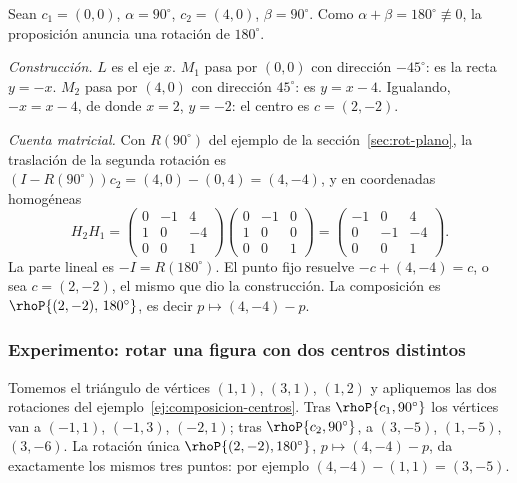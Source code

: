 \begin{ejemplo}\label{ej:composicion-centros}
Sean \(c_1=(0,0)\), \(\alpha=90^\circ\), \(c_2=(4,0)\), \(\beta=90^\circ\). Como
\(\alpha+\beta=180^\circ\not\equiv0\), la proposición anuncia una rotación de \(180^\circ\).

\emph{Construcción.} \(L\) es el eje \(x\). \(M_1\) pasa por \((0,0)\) con dirección
\(-45^\circ\): es la recta \(y=-x\). \(M_2\) pasa por \((4,0)\) con dirección \(45^\circ\):
es \(y=x-4\). Igualando, \(-x=x-4\), de donde \(x=2\), \(y=-2\): el centro es \(c=(2,-2)\).

\emph{Cuenta matricial.} Con \(R(90^\circ)\) del ejemplo de la sección~\ref{sec:rot-plano}, la
traslación de la segunda rotación es \((I-R(90^\circ))c_2=(4,0)-(0,4)=(4,-4)\), y en
coordenadas homogéneas
\[
H_2H_1=
\begin{pmatrix}0&-1&4\\1&0&-4\\0&0&1\end{pmatrix}
\begin{pmatrix}0&-1&0\\1&0&0\\0&0&1\end{pmatrix}
=\begin{pmatrix}-1&0&4\\0&-1&-4\\0&0&1\end{pmatrix}.
\]
La parte lineal es \(-I=R(180^\circ)\). El punto fijo resuelve \(-c+(4,-4)=c\), o sea
\(c=(2,-2)\), el mismo que dio la construcción. La composición es
\(\rhoP{(2,-2),\,180^\circ}\), es decir \(p\mapsto(4,-4)-p\).
\end{ejemplo}

\subsubsection{Experimento: rotar una figura con dos centros distintos}

Tomemos el triángulo de vértices \((1,1)\), \((3,1)\), \((1,2)\) y apliquemos las dos
rotaciones del ejemplo~\ref{ej:composicion-centros}. Tras \(\rhoP{c_1,90^\circ}\) los vértices
van a \((-1,1)\), \((-1,3)\), \((-2,1)\); tras \(\rhoP{c_2,90^\circ}\), a \((3,-5)\),
\((1,-5)\), \((3,-6)\). La rotación única \(\rhoP{(2,-2),180^\circ}\), \(p\mapsto(4,-4)-p\),
da exactamente los mismos tres puntos: por ejemplo \((4,-4)-(1,1)=(3,-5)\).


